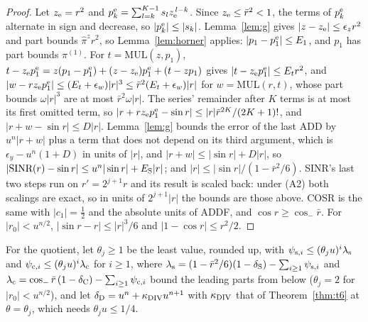 \begin{proof}
Let $z_{\rm e} = r^2$ and $p^{\rm e}_k = \sum_{l=k}^{K-1}s_lz_{\rm e}^{\,l-k}$. Since $z_{\rm e} \le \bar r^2 < 1$, the terms
of $p^{\rm e}_k$ alternate in sign and decrease, so $|p^{\rm e}_k| \le |s_k|$. Lemma~\ref{lem:g} gives $|z - z_{\rm
e}| \le \epsilon_zr^2$ and part bounds $\hat\pi^zr^2$, so Lemma~\ref{lem:horner} applies: $|p_1 - p^{\rm e}_1| \le E_1$,
and $p_1$ has part bounds $\pi^{(1)}$. For $t = \mathrm{MUL}(z, p_1)$, $t - z_{\rm e}p^{\rm e}_1 = z(p_1 - p^{\rm
e}_1) + (z - z_{\rm e})p^{\rm e}_1 + (t - zp_1)$ gives $|t - z_{\rm e}p^{\rm e}_1| \le E_tr^2$, and $|w - rz_{\rm e}p^{\rm e}_1| \le (E_t + \epsilon_w)|r|^3 \le
\bar r^2(E_t + \epsilon_w)|r|$ for $w = \mathrm{MUL}(r, t)$, whose part bounds $\omega|r|^3$ are at most $\bar r^2\omega|r|$.
The series' remainder after $K$ terms is at most its first omitted term, so $|r + rz_{\rm e}p^{\rm e}_1 - \sin r| \le
|r|\bar r^{2K}/(2K+1)!$, and $|r + w - \sin r| \le D|r|$. Lemma~\ref{lem:g} bounds the error of the last ADD by $u^n|r +
w|$ plus a term that does not depend on its third argument, which is $\epsilon_y - u^n(1+D)$ in units of $|r|$, and
$|r + w| \le |\sin r| + D|r|$, so $|\textrm{SINR}(r) - \sin r| \le u^n|\sin r| + E_{\rm S}|r|$; and $|r| \le |\sin r|/(1 - \bar r^2/6)$. SINR's last two steps run on $r' = 2^{j+1}r$ and its result is scaled back: under
(A2) both scalings are exact, so in units of $2^{j+1}|r|$ the bounds are those above. COSR is the same
with $|c_1| = \frac12$ and the absolute units of ADDF, and $\cos r \ge \cos_- \bar r$. For $|r_0| < u^{n/2}$, $|\sin r - r| \le
|r|^3/6$ and $|1 - \cos r| \le r^2/2$.
\end{proof}

For the quotient, let $\theta_j \ge 1$ be the least value, rounded up, with $\psi_{{\rm s},i} \le (\theta_ju)^i\lambda_{\rm s}$
and $\psi_{{\rm c},i} \le (\theta_ju)^i\lambda_{\rm c}$ for $i \ge 1$, where $\lambda_{\rm s} = (1 - \bar r^2/6)(1 -
\delta_{\rm S}) - \sum_{i \ge 1}\psi_{{\rm s},i}$ and $\lambda_{\rm c} = \cos_-\bar r\,(1 - \delta_{\rm C}) - \sum_{i \ge
1}\psi_{{\rm c},i}$ bound the leading parts from below ($\theta_j = 2$ for $|r_0| < u^{n/2}$), and let $\delta_{\rm D} =
u^n + \kappa_{\rm DIV} u^{n+1}$ with $\kappa_{\rm DIV}$ that of Theorem~\ref{thm:t6} at $\theta = \theta_j$, which needs $\theta_ju \le 1/4$.

